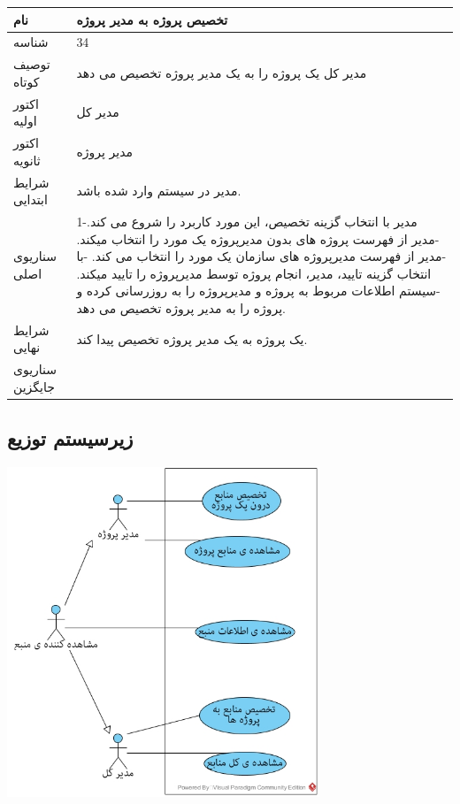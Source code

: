 \documentclass{article}
\begin{document}
\vspace{2cm}

\begin{tabular}{|p{2cm}|p{10cm}|}
\hline
نام
&
تخصیص پروژه به مدیر پروژه
\\
\hline
شناسه
&
34
\\
\hline
توصیف کوتاه
&
مدیر کل یک پروژه را به یک مدیر پروژه تخصیص می دهد
\\
\hline
اکتور اولیه
&
مدیر کل
\\
\hline
اکتور ثانویه
&
مدیر پروژه
\\
\hline
شرایط ابتدایی
&
مدیر در سیستم وارد شده باشد.
\\
\hline
سناریوی اصلی
&
1-مدیر با انتخاب گزینه تخصیص، این مورد کاربرد را شروع می کند.
\newline
2-مدیر از فهرست پروژه های بدون مدیرپروژه یک مورد را انتخاب میکند.
\newline
3-مدیر از فهرست مدیرپروژه های سازمان یک مورد را انتخاب می کند.
\newline
4-با انتخاب گزینه تایید، مدیر، انجام پروژه توسط مدیرپروژه را تایید میکند. 
\newline
5-سیستم اطلاعات مربوط به پروژه و مدیرپروژه را به روزرسانی کرده و پروژه را به مدیر پروژه تخصیص می دهد.
\\
\hline
شرایط نهایی
&
یک پروژه به یک مدیر پروژه تخصیص پیدا کند.
\\
\hline
سناریوی جایگزین
&

\\
\hline
\end{tabular}



\newpage
\subsection{زیرسیستم توزیع}

\vspace{2cm}
\begin{center}
\includegraphics[width=0.7\textwidth]{Diagrams/Resources.jpg}
\end{center}
\end{document}
